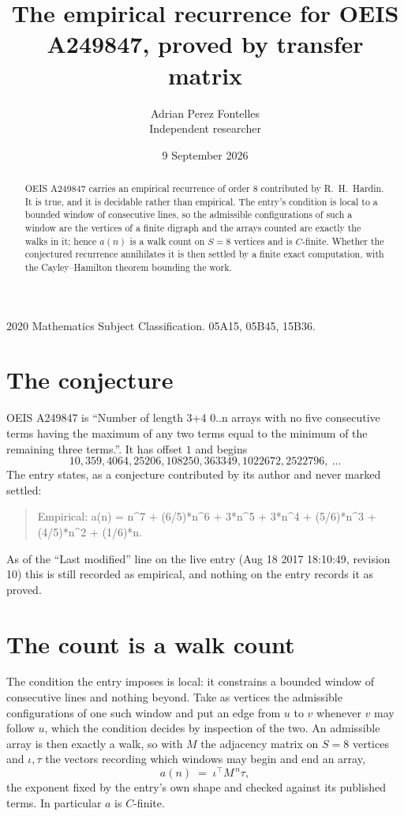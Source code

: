 \documentclass[11pt,a4paper]{article}
\title{The empirical recurrence for OEIS A249847, proved by transfer matrix}
\author{Adrian Perez Fontelles\\ \small Independent researcher}
\date{9 September 2026}
\theoremstyle{plain}
\theoremstyle{definition}
\begin{document}
\maketitle

\begin{abstract}
OEIS A249847 carries an empirical recurrence of order $8$ contributed by R.~H.~Hardin. It is
true, and it is decidable rather than empirical. The entry's condition is local to a bounded window of consecutive lines, so
the admissible configurations of such a window are the vertices of a finite digraph and the
arrays counted are exactly the walks in it; hence $a(n)$ is a walk count on $S=8$ vertices
and is $C$-finite. Whether the conjectured recurrence annihilates it is then settled by a
finite exact computation, with the Cayley--Hamilton theorem bounding the work.
\end{abstract}

\noindent\small 2020 Mathematics Subject Classification. 05A15, 05B45, 15B36.\normalsize

\section{The conjecture}

OEIS A249847 is ``Number of length 3+4 0..n arrays with no five consecutive terms having the maximum of any two terms equal to the minimum of the remaining three terms.''. It has offset $1$ and begins
\[
10, 359, 4064, 25206, 108250, 363349, 1022672, 2522796,\ \dots
\]
The entry states, as a conjecture contributed by its author and never marked settled:
\begin{quote}
Empirical: a(n) = n\^{}7 + (6/5)*n\^{}6 + 3*n\^{}5 + 3*n\^{}4 + (5/6)*n\^{}3 + (4/5)*n\^{}2 + (1/6)*n.
\end{quote}
As of the ``Last modified'' line on the live entry (Aug 18 2017 18:10:49, revision 10) this is still
recorded as empirical, and nothing on the entry records it as proved.

\section{The count is a walk count}

The condition the entry imposes is local: it constrains a bounded window of consecutive lines and nothing beyond. Take as
vertices the admissible configurations of one such window and put an edge from $u$ to $v$
whenever $v$ may follow $u$, which the condition decides by inspection of the two. An
admissible array is then exactly a walk, so with $M$ the adjacency matrix on $S=8$ vertices
and $\iota,\tau$ the vectors recording which windows may begin and end an array,
\[
a(n)\;=\;\iota^{\!\top}M^{\,n}\tau ,
\]
the exponent fixed by the entry's own shape and checked against its published terms. In
particular $a$ is $C$-finite.
\end{document}
